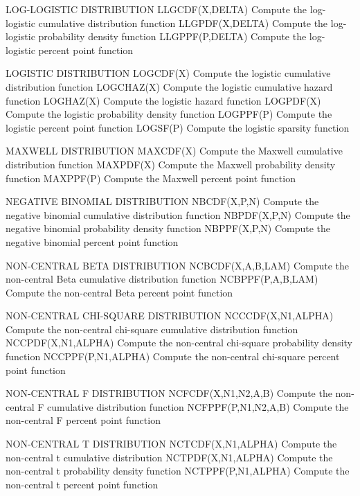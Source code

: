 LOG-LOGISTIC DISTRIBUTION
   LLGCDF(X,DELTA)    Compute the log-logistic cumulative distribution
                      function
   LLGPDF(X,DELTA)    Compute the log-logistic probability density
                      function
   LLGPPF(P,DELTA)    Compute the log-logistic percent point function
 
LOGISTIC DISTRIBUTION
   LOGCDF(X)          Compute the logistic cumulative distribution
                      function
   LOGCHAZ(X)         Compute the logistic cumulative hazard
                      function
   LOGHAZ(X)          Compute the logistic hazard function
   LOGPDF(X)          Compute the logistic probability density function
   LOGPPF(P)          Compute the logistic percent point function
   LOGSF(P)           Compute the logistic sparsity function
 
MAXWELL DISTRIBUTION
   MAXCDF(X)          Compute the Maxwell cumulative distribution
                      function
   MAXPDF(X)          Compute the Maxwell probability density function
   MAXPPF(P)          Compute the Maxwell percent point function

NEGATIVE BINOMIAL DISTRIBUTION
   NBCDF(X,P,N)       Compute the negative binomial cumulative
                      distribution function
   NBPDF(X,P,N)       Compute the negative binomial probability density
                      function
   NBPPF(X,P,N)       Compute the negative binomial percent point
                      function
 
NON-CENTRAL BETA DISTRIBUTION
   NCBCDF(X,A,B,LAM)  Compute the non-central Beta cumulative
                      distribution function
   NCBPPF(P,A,B,LAM)  Compute the non-central Beta percent point
                      function
 
NON-CENTRAL CHI-SQUARE DISTRIBUTION
   NCCCDF(X,N1,ALPHA) Compute the non-central chi-square cumulative
                      distribution function
   NCCPDF(X,N1,ALPHA) Compute the non-central chi-square probability
                      density function
   NCCPPF(P,N1,ALPHA) Compute the non-central chi-square percent point
                      function
 
NON-CENTRAL F DISTRIBUTION
   NCFCDF(X,N1,N2,A,B) Compute the non-central F cumulative
                       distribution function
   NCFPPF(P,N1,N2,A,B) Compute the non-central F percent point function
 
NON-CENTRAL T DISTRIBUTION
   NCTCDF(X,N1,ALPHA) Compute the non-central t cumulative distribution
   NCTPDF(X,N1,ALPHA) Compute the non-central t probability density
                      function
   NCTPPF(P,N1,ALPHA) Compute the non-central t percent point function
 
